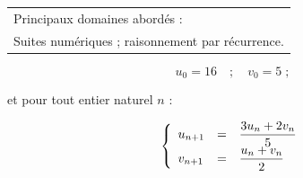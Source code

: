 \medskip

\begin{tabular}{|l|}\hline
Principaux domaines abordés :\\
Suites numériques ; raisonnement par récurrence.\\ \hline
\end{tabular}

\medskip



\[u_0 = 16 \quad ;\quad  v_0 = 5 \;;\]

et pour tout entier naturel $n$ :

\renewcommand\arraystretch{2}
\[\left\{\begin{array}{l c l}
u_{n+1}&=&\dfrac{3u_n + 2v_n}{5}\\
v_{n+1}&=& \dfrac{u_n + v_n}{2}
\end{array}\right.\]
\renewcommand\arraystretch{1}

\smallskip

